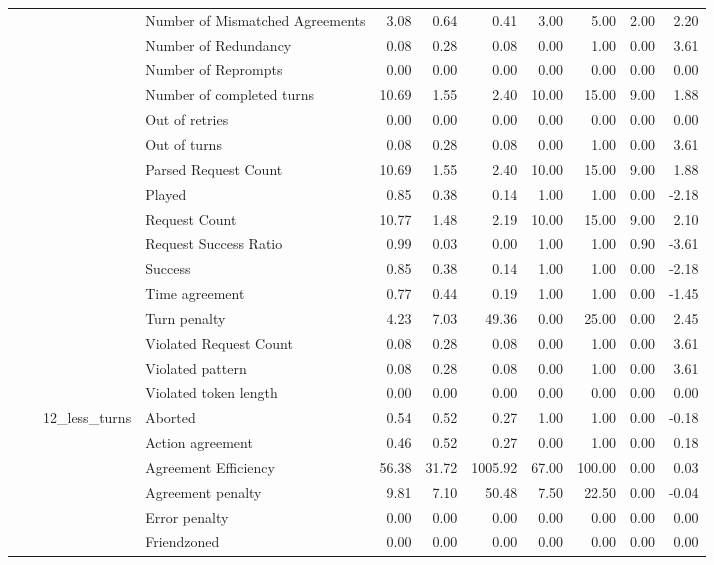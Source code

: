\begin{tabular}{llllrrrrrrr}
 &  &  & Number of Mismatched Agreements & 3.08 & 0.64 & 0.41 & 3.00 & 5.00 & 2.00 & 2.20 \\
 &  &  & Number of Redundancy & 0.08 & 0.28 & 0.08 & 0.00 & 1.00 & 0.00 & 3.61 \\
 &  &  & Number of Reprompts & 0.00 & 0.00 & 0.00 & 0.00 & 0.00 & 0.00 & 0.00 \\
 &  &  & Number of completed turns & 10.69 & 1.55 & 2.40 & 10.00 & 15.00 & 9.00 & 1.88 \\
 &  &  & Out of retries & 0.00 & 0.00 & 0.00 & 0.00 & 0.00 & 0.00 & 0.00 \\
 &  &  & Out of turns & 0.08 & 0.28 & 0.08 & 0.00 & 1.00 & 0.00 & 3.61 \\
 &  &  & Parsed Request Count & 10.69 & 1.55 & 2.40 & 10.00 & 15.00 & 9.00 & 1.88 \\
 &  &  & Played & 0.85 & 0.38 & 0.14 & 1.00 & 1.00 & 0.00 & -2.18 \\
 &  &  & Request Count & 10.77 & 1.48 & 2.19 & 10.00 & 15.00 & 9.00 & 2.10 \\
 &  &  & Request Success Ratio & 0.99 & 0.03 & 0.00 & 1.00 & 1.00 & 0.90 & -3.61 \\
 &  &  & Success & 0.85 & 0.38 & 0.14 & 1.00 & 1.00 & 0.00 & -2.18 \\
 &  &  & Time agreement & 0.77 & 0.44 & 0.19 & 1.00 & 1.00 & 0.00 & -1.45 \\
 &  &  & Turn penalty & 4.23 & 7.03 & 49.36 & 0.00 & 25.00 & 0.00 & 2.45 \\
 &  &  & Violated Request Count & 0.08 & 0.28 & 0.08 & 0.00 & 1.00 & 0.00 & 3.61 \\
 &  &  & Violated pattern & 0.08 & 0.28 & 0.08 & 0.00 & 1.00 & 0.00 & 3.61 \\
 &  &  & Violated token length & 0.00 & 0.00 & 0.00 & 0.00 & 0.00 & 0.00 & 0.00 \\
\cline{3-11}
 &  & \multirow[t]{27}{*}{12_less_turns} & Aborted & 0.54 & 0.52 & 0.27 & 1.00 & 1.00 & 0.00 & -0.18 \\
 &  &  & Action agreement & 0.46 & 0.52 & 0.27 & 0.00 & 1.00 & 0.00 & 0.18 \\
 &  &  & Agreement Efficiency & 56.38 & 31.72 & 1005.92 & 67.00 & 100.00 & 0.00 & 0.03 \\
 &  &  & Agreement penalty & 9.81 & 7.10 & 50.48 & 7.50 & 22.50 & 0.00 & -0.04 \\
 &  &  & Error penalty & 0.00 & 0.00 & 0.00 & 0.00 & 0.00 & 0.00 & 0.00 \\
 &  &  & Friendzoned & 0.00 & 0.00 & 0.00 & 0.00 & 0.00 & 0.00 & 0.00 \\

\end{tabular}
